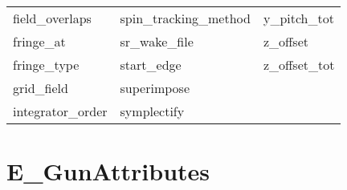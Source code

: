 \begin{tabular}{lll}
field_overlaps              & spin_tracking_method        & y_pitch_tot                 \\
fringe_at                   & sr_wake_file                & z_offset                    \\
fringe_type                 & start_edge                  & z_offset_tot                \\
grid_field                  & superimpose                 &                             \\
integrator_order            & symplectify                 &                             \\
 \bottomrule
 \end{tabular}
 \vfill
 
 \section{E_GunAttributes}
 \label{s:list.e.gun}
 

